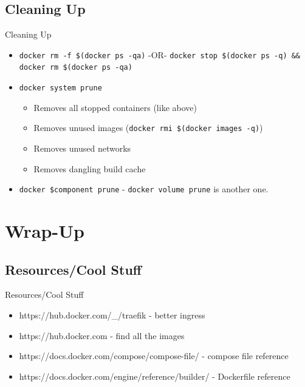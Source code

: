 \documentclass{beamer}
\begin{document}
\subsection{Cleaning Up}
\begin{frame}{Cleaning Up}
    \begin{itemize}
        \item \texttt{docker rm -f \$(docker ps -qa)} -OR- \texttt{docker stop \$(docker ps -q) && docker rm \$(docker ps -qa)}
        \item \texttt{docker system prune}
        \begin{itemize}
            \item Removes all stopped containers (like above)
            \item Removes unused images (\texttt{docker rmi \$(docker images -q)})
            \item Removes unused networks
            \item Removes dangling build cache
        \end{itemize}
        \item \texttt{docker \$component prune} - \texttt{docker volume prune} is another one.
    \end{itemize}
\end{frame}

\section{Wrap-Up}
\subsection{Resources/Cool Stuff}
\begin{frame}{Resources/Cool Stuff}
    \begin{itemize}
        \item https://hub.docker.com/\_/traefik - better ingress
        \item https://hub.docker.com - find all the images
        \item https://docs.docker.com/compose/compose-file/ - compose file reference
        \item https://docs.docker.com/engine/reference/builder/ - Dockerfile reference
    \end{itemize}
\end{frame}
\end{document}
